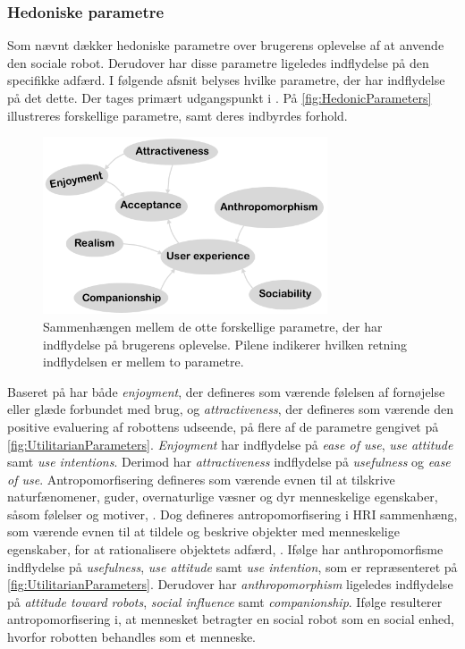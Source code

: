 \subsubsection*{Hedoniske parametre}
\label{InteraktionSocialeRobotterParametreHedonic}
%
Som nævnt dækker hedoniske parametre over brugerens oplevelse af at anvende den sociale robot. Derudover har disse parametre ligeledes indflydelse på den specifikke adfærd. I følgende afsnit belyses hvilke parametre, der har indflydelse på det dette. Der tages primært udgangspunkt i \textcite[ss. 1477-1478]{PDF:SharingALifeHarvey}. På \autoref{fig:HedonicParameters} illustreres forskellige parametre, samt deres indbyrdes forhold.
%
\begin{figure}[H]
\centering
\includegraphics[width = 0.75\textwidth]{Figure/HedonicParameters} 
\caption{Sammenhængen mellem de otte forskellige parametre, der har indflydelse på brugerens oplevelse. Pilene indikerer hvilken retning indflydelsen er mellem to parametre.}
\label{fig:HedonicParameters}
\end{figure}
\noindent 
%
Baseret på \textcite[s. 1477]{PDF:ExploringInfluencingVariable} har både \textit{enjoyment}, der defineres som værende følelsen af fornøjelse eller glæde forbundet med brug, og \textit{attractiveness}, der defineres som værende den positive evaluering af robottens udseende, på flere af de parametre gengivet på \autoref{fig:UtilitarianParameters}. \textit{Enjoyment} har indflydelse på \textit{ease of use}, \textit{use attitude} samt \textit{use intentions}. Derimod har \textit{attractiveness} indflydelse på \textit{usefulness} og \textit{ease of use}. \blankline 
%
Antropomorfisering defineres som værende evnen til at tilskrive naturfænomener, guder, overnaturlige væsner og dyr menneskelige egenskaber, såsom følelser og motiver, \parencite{WEB:DefAntropomorisering}. Dog defineres antropomorfisering i HRI sammenhæng, som værende evnen til at tildele og beskrive objekter med menneskelige egenskaber, for at rationalisere objektets adfærd, \parencite[s. 1478]{PDF:ExploringInfluencingVariable}. Ifølge \textcite[s. 1478]{PDF:ExploringInfluencingVariable} har anthropomorfisme indflydelse på \textit{usefulness}, \textit{use attitude} samt \textit{use intention}, som er repræsenteret på \autoref{fig:UtilitarianParameters}. Derudover har \textit{anthropomorphism} ligeledes indflydelse på \textit{attitude toward robots}, \textit{social influence} samt \textit{companionship}. Ifølge \textcite[s. 19]{PDF:CloseButNotStuck} resulterer antropomorfisering i, at mennesket betragter en social robot som en social enhed, hvorfor robotten behandles som et menneske.

